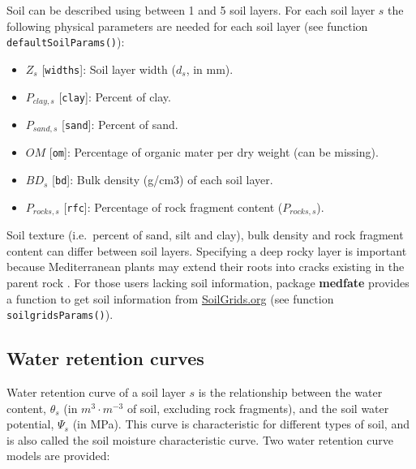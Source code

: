 \documentclass[]{book}
\providecommand{\tightlist}{%
  \setlength{\itemsep}{0pt}\setlength{\parskip}{0pt}}
\begin{document}
Soil can be described using between 1 and 5 soil layers. For each soil layer \(s\) the following physical parameters are needed for each soil layer (see function \texttt{defaultSoilParams()}):

\begin{itemize}
\tightlist
\item
  \(Z_{s}\) {[}\texttt{widths}{]}: Soil layer width (\(d_s\), in mm).
\item
  \(P_{clay,s}\) {[}\texttt{clay}{]}: Percent of clay.
\item
  \(P_{sand,s}\) {[}\texttt{sand}{]}: Percent of sand.
\item
  \(OM\) {[}\texttt{om}{]}: Percentage of organic mater per dry weight (can be missing).
\item
  \(BD_{s}\) {[}\texttt{bd}{]}: Bulk density (g/cm3) of each soil layer.
\item
  \(P_{rocks,s}\) {[}\texttt{rfc}{]}: Percentage of rock fragment content (\(P_{rocks,s}\)).
\end{itemize}

Soil texture (i.e.~percent of sand, silt and clay), bulk density and rock fragment content can differ between soil layers. Specifying a deep rocky layer is important because Mediterranean plants may extend their roots into cracks existing in the parent rock \citep{Ruffault2013}. For those users lacking soil information, package \textbf{medfate} provides a function to get soil information from \href{https://soilgrids.org/}{SoilGrids.org} (see function \texttt{soilgridsParams()}).

\hypertarget{water-retention-curves}{%
\subsection{Water retention curves}\label{water-retention-curves}}

Water retention curve of a soil layer \(s\) is the relationship between the water content, \(\theta_s\) (in \(m^3 \cdot m^{-3}\) of soil, excluding rock fragments), and the soil water potential, \(\Psi_s\) (in MPa). This curve is characteristic for different types of soil, and is also called the soil moisture characteristic curve. Two water retention curve models are provided:
\end{document}
